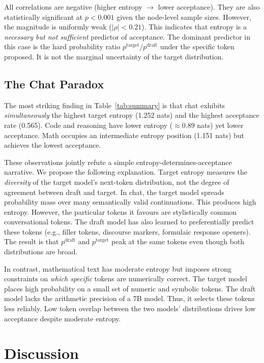 \documentclass[conference]{IEEEtran}
\begin{document}
All correlations are negative (higher entropy $\to$ lower acceptance).
They are also statistically significant at $p < 0.001$ given the node-level
sample sizes. However, the magnitude is uniformly weak ($|\rho| < 0.21$).
This indicates that entropy is a \emph{necessary but not sufficient} predictor
of acceptance. The dominant predictor in this case is the hard
probability ratio $p^{\text{target}}/p^{\text{draft}}$ under the specific
token proposed. It is not the marginal uncertainty of the target distribution.

\subsection{The Chat Paradox}

The most striking finding in Table~\ref{tab:summary} is that chat exhibits
\emph{simultaneously} the highest target entropy (1.252 nats) and the highest
acceptance rate (0.565). Code and reasoning have lower entropy ($\approx 0.89$
nats) yet lower acceptance. Math occupies an intermediate entropy position
(1.151 nats) but achieves the lowest acceptance.

These observations jointly refute a simple entropy-determines-acceptance
narrative. We propose the following explanation. Target entropy measures the
\emph{diversity} of the target model's next-token distribution, not the degree
of agreement between draft and target. In chat, the target model spreads probability mass over many semantically
valid continuations. This produces high entropy. However, the particular
tokens it favours are stylistically common conversational tokens. The draft
model has also learned to preferentially predict these tokens (e.g., filler
tokens, discourse markers, formulaic response openers).
The result is that $p^{\text{draft}}$ and $p^{\text{target}}$ peak at the
same tokens even though both distributions are broad.

In contrast, mathematical text has moderate entropy but imposes strong
constraints on \emph{which specific} tokens are numerically correct.
The target model places high probability on a small set of numeric and
symbolic tokens. The draft model lacks the arithmetic precision of a 7B model.
Thus, it selects these tokens less reliably. Low token overlap between
the two models' distributions drives low acceptance despite moderate entropy.

\section{Discussion}
\end{document}
